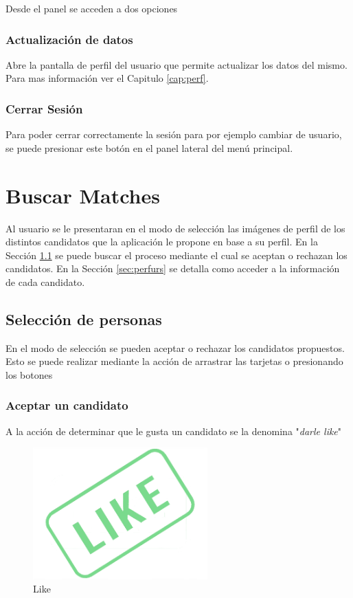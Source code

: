 \documentclass[10pt,letterpaper,extrafontsizes]{memoir}
\begin{document}
Desde el panel se acceden a dos opciones

\subsection{Actualización de datos}

Abre la pantalla de perfil del usuario que permite actualizar los datos del mismo. Para mas información ver el Capitulo \ref{cap:perf}.

\subsection{Cerrar Sesión}

Para poder cerrar correctamente la sesión para por ejemplo cambiar de usuario, se puede presionar este botón en el panel lateral del menú principal.

\chapter{Buscar Matches}\label{cap:match}

Al usuario se le presentaran en el modo de selección las imágenes de perfil de los distintos candidatos que la aplicación le propone en base a su perfil. En la Sección \ref{sec:secper} se puede buscar el proceso mediante el cual se aceptan o rechazan los candidatos. En la Sección \ref{sec:perfurs} se detalla como acceder a la información	 de cada candidato.

\newpage
\section{Selección de personas} \label{sec:secper}

En el modo de selección se pueden aceptar o rechazar los candidatos propuestos. Esto se puede realizar mediante la acción de arrastrar las tarjetas o presionando los botones

\subsection{Aceptar un candidato}

A la acción de determinar que le gusta un candidato se la denomina "\emph{darle like}"

\begin{figure}[H]
    \centering
\includegraphics[width=0.6\textwidth]{graficos/imagenes/like}
    \caption{Like}
    \label{fig:like}
\end{figure}
\end{document}
